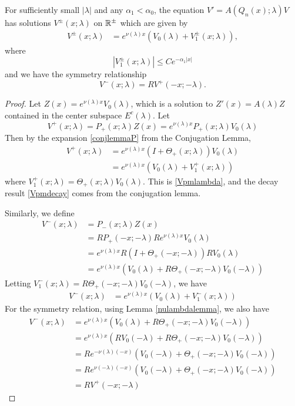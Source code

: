 \documentclass[thesis.tex]{subfiles}
\begin{document}
\begin{lemma}\label{lemma:Vpm}
For sufficiently small $|\lambda|$ and any $\alpha_1 < \alpha_0$, the equation $V' = A(Q_n(x); \lambda)V$ has solutions $V^\pm(x; \lambda)$ on $\mathbb{R}^\pm$ which are given by
\begin{align}\label{Vpmlambda}
V^\pm(x; \lambda) &= e^{\nu(\lambda)x}(V_0(\lambda) + V_1^\pm(x; \lambda)),
\end{align}
where
\begin{equation}\label{Vpmdecay}
|V_1^\pm(x; \lambda)| \leq C e^{-\alpha_1 |x|}
\end{equation}
and we have the symmetry relationship
\begin{equation}\label{Vpmsymmetry}
V^-(x; \lambda) = R V^+(-x; -\lambda).
\end{equation}
\begin{proof}
Let $Z(x) = e^{\nu(\lambda)x}V_0(\lambda)$, which is a solution to $Z'(x) = A(\lambda)Z$ contained in the center subspace $E^c(\lambda)$. Let
\[
V^+(x; \lambda) = P_+(x; \lambda) Z(x) = e^{\nu(\lambda)x}P_+(x; \lambda)V_0(\lambda)
\]
Then by the expansion \eqref{conjlemmaP} from the Conjugation Lemma,
\begin{align*}
V^+(x; \lambda) &= e^{\nu(\lambda)x}(I + \Theta_+(x; \lambda))V_0(\lambda) \\
&= e^{\nu(\lambda)x}( V_0(\lambda) + V_1^+(x; \lambda))
\end{align*}
where $V_1^+(x; \lambda) = \Theta_+(x; \lambda) V_0(\lambda)$. This is \eqref{Vpmlambda}, and the decay result \eqref{Vpmdecay} comes from the conjugation lemma.

Similarly, we define 
\begin{align*}
V^-(x; \lambda) &= P_-(x; \lambda) Z(x) \\
&= RP_+(-x; -\lambda)R e^{\nu(\lambda)x} V_0(\lambda) \\
&= e^{\nu(\lambda)x} R(I + \Theta_+(-x; -\lambda))R V_0(\lambda) \\
&= e^{\nu(\lambda)x}( V_0(\lambda) + R\Theta_+(-x; -\lambda) V_0(-\lambda) )
\end{align*}
Letting $V_1^-(x; \lambda) = R\Theta_+(-x; -\lambda) V_0(-\lambda)$, we have
\begin{align*}
V^-(x; \lambda) &= e^{\nu(\lambda)x}( V_0(\lambda) + V_1^-(x; \lambda))
\end{align*}
For the symmetry relation, using Lemma \ref{nulambdalemma}, we also have
\begin{align*}
V^-(x; \lambda) &= e^{\nu(\lambda)x}( V_0(\lambda) + R\Theta_+(-x; -\lambda) V_0(-\lambda) ) \\
&= e^{\nu(\lambda)x}( R V_0(-\lambda) + R\Theta_+(-x; -\lambda) V_0(-\lambda) ) \\
&= R e^{-\nu(\lambda)(-x)}( V_0(-\lambda) + \Theta_+(-x; -\lambda) V_0(-\lambda) ) \\
&= R e^{\nu(-\lambda)(-x)}( V_0(-\lambda) + \Theta_+(-x; -\lambda) V_0(-\lambda) ) \\
&= R V^+(-x; -\lambda)
\end{align*}
\end{proof}
\end{lemma}
\end{document}
